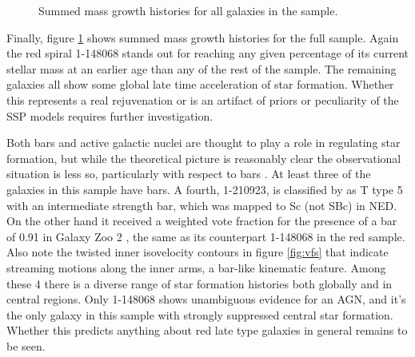 \documentclass[modern]{aastex62}
\begin{document}
\begin{figure}
\caption{Summed mass growth histories for all galaxies in the sample.}
\label{fig:totalmgh}
\end{figure}

Finally, figure \ref{fig:totalmgh} shows summed mass growth histories for the full sample. Again the red spiral 1-148068 stands out for reaching any given percentage of its current stellar mass at an earlier age than any of the rest of the sample. The remaining galaxies all show some global late time acceleration of star formation. Whether this represents a real rejuvenation or is an artifact of priors or peculiarity of the SSP models requires further investigation.

Both bars and active galactic nuclei are thought to play a role in regulating star formation, but while the theoretical picture is reasonably clear \citep{2004ARA&A..42..603K, 2013seg..book....1K, 2013ARA&A..51..511K} the observational situation is less so, particularly with respect to bars \citep{2012ApJS..198....4O}. At least three of the galaxies in this sample have bars. A fourth, 1-210923, is classified by \citet{2010ApJS..186..427N} as T type 5 with an intermediate strength bar, which was mapped to Sc (not SBc) in NED. On the other hand it received a weighted vote fraction for the presence of a bar of 0.91 in Galaxy Zoo 2 \citep{2013MNRAS.435.2835W}, the same as its counterpart 1-148068 in the red sample. Also note the twisted inner isovelocity contours in figure \ref{fig:vfs} that indicate streaming motions along the inner arms, a bar-like kinematic feature. Among these 4 there is a diverse range of star formation histories both globally and in central regions. Only 1-148068 shows unambiguous evidence for an AGN, and it's the only galaxy in this sample with strongly suppressed central star formation. Whether this predicts anything about red late type galaxies in general remains to be seen.
\end{document}
